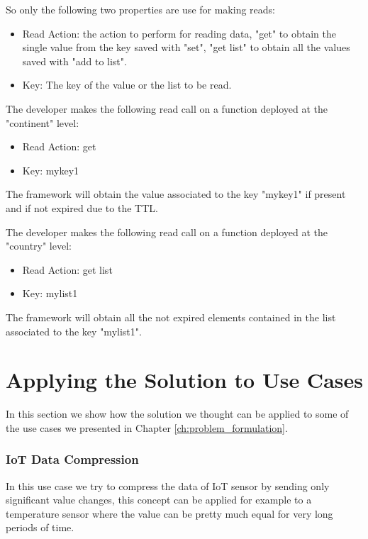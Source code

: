So only the following two properties are use for making reads:
\begin{itemize}
    \item Read Action: the action to perform for reading data, "get" to obtain the single value from the key saved with "set", "get list" to obtain all the values saved with "add to list".
    \item Key: The key of the value or the list to be read.
\end{itemize}

\begin{example}
The developer makes the following read call on a function deployed at the "continent" level:
\begin{itemize}
    \item Read Action: get
    \item Key: mykey1
\end{itemize}
The framework will obtain the value associated to the key "mykey1" if present and if not expired due to the TTL.
\end{example}

\begin{example}
The developer makes the following read call on a function deployed at the "country" level:
\begin{itemize}
    \item Read Action: get list
    \item Key: mylist1
\end{itemize}
The framework will obtain all the not expired elements contained in the list associated to the key "mylist1".
\end{example}


\section{Applying the Solution to Use Cases}
\label{sec:solution_use_cases}
In this section we show how the solution we thought can be applied to some of the use cases we presented in Chapter \ref{ch:problem_formulation}.


\subsubsection{IoT Data Compression}
In this use case we try to compress the data of IoT sensor by sending only significant value changes, this concept can be applied for example to a temperature sensor where the value can be pretty much equal for very long periods of time.

